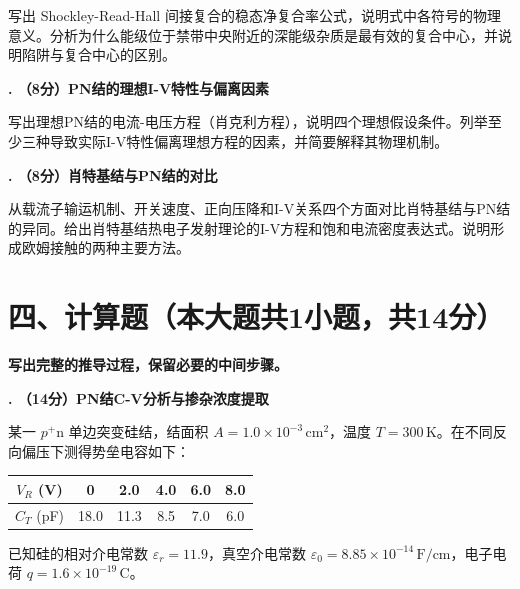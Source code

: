 \documentclass[12pt,a4paper]{ctexart}
\newcounter{qcounter}
\newcommand{\选择题}{\stepcounter{qcounter}\arabic{qcounter}.\,}
\newcommand{\填空题}{\stepcounter{qcounter}\arabic{qcounter}.\,}
\begin{document}
写出 Shockley-Read-Hall 间接复合的稳态净复合率公式，说明式中各符号的物理意义。分析为什么能级位于禁带中央附近的深能级杂质是最有效的复合中心，并说明陷阱与复合中心的区别。

\vspace{12cm}

\newpage

\noindent\textbf{. （8分）PN结的理想I-V特性与偏离因素}

写出理想PN结的电流-电压方程（肖克利方程），说明四个理想假设条件。列举至少三种导致实际I-V特性偏离理想方程的因素，并简要解释其物理机制。

\vspace{11cm}

\noindent\textbf{. （8分）肖特基结与PN结的对比}

从载流子输运机制、开关速度、正向压降和I-V关系四个方面对比肖特基结与PN结的异同。给出肖特基结热电子发射理论的I-V方程和饱和电流密度表达式。说明形成欧姆接触的两种主要方法。

\newpage

\section*{四、计算题（本大题共1小题，共14分）}

\textbf{写出完整的推导过程，保留必要的中间步骤。}

\vspace{4pt}

\setcounter{qcounter}{0}

\noindent\textbf{. （14分）PN结C-V分析与掺杂浓度提取}

某一 $p^+$n 单边突变硅结，结面积 $A = 1.0 \times 10^{-3}\,\text{cm}^2$，温度 $T = 300\,\text{K}$。在不同反向偏压下测得势垒电容如下：

\begin{center}
\begin{tabular}{c|ccccc}
\toprule
$V_R$ (V) & 0 & 2.0 & 4.0 & 6.0 & 8.0 \\
\midrule
$C_T$ (pF) & 18.0 & 11.3 & 8.5 & 7.0 & 6.0 \\
\bottomrule
\end{tabular}
\end{center}

已知硅的相对介电常数 $\varepsilon_r = 11.9$，真空介电常数 $\varepsilon_0 = 8.85 \times 10^{-14}\,\text{F/cm}$，电子电荷 $q = 1.6 \times 10^{-19}\,\text{C}$。
\end{document}
